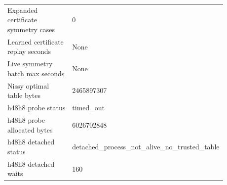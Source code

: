 {\begin{tabular}{@{}p{0.54\linewidth}p{0.34\linewidth}@{}}
Expanded certificate symmetry cases & 0 \\
Learned certificate replay seconds & None \\
Live symmetry batch max seconds & None \\
Nissy optimal table bytes & 2465897307 \\
h48h8 probe status & timed\_\allowbreak{}out \\
h48h8 probe allocated bytes & 6026702848 \\
h48h8 detached status & detached\_\allowbreak{}process\_\allowbreak{}not\_\allowbreak{}alive\_\allowbreak{}no\_\allowbreak{}trusted\_\allowbreak{}table \\
h48h8 detached waits & 160 \\
\hline
\end{tabular}
}
